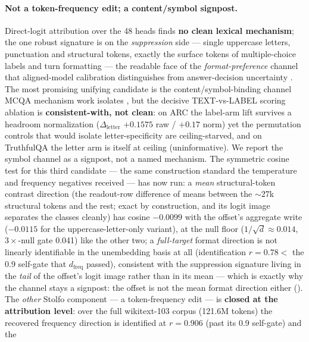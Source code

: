 \paragraph{Not a token-frequency edit; a content/symbol signpost.}
Direct-logit attribution over the 48 heads finds \textbf{no clean lexical
mechanism}; the one robust signature is on the \emph{suppression} side --- single
uppercase letters, punctuation and structural tokens, exactly the surface tokens of
multiple-choice labels and turn formatting --- the readable face of the
\emph{format-preference} channel that aligned-model calibration distinguishes from
answer-decision uncertainty \citep{AlignedMCCalibration}. The most promising
unifying candidate is the content/symbol-binding channel MCQA mechanism work
isolates \citep{TwoStageMCQA,CorrectLetterHeads}, but the decisive TEXT-vs-LABEL
scoring ablation is \textbf{consistent-with, not clean}: on ARC the label-arm lift
survives a headroom normalization ($\Delta_{\mathrm{letter}}$ $+0.1575$ raw /
$+0.17$ norm) yet the permutation controls that would isolate letter-specificity
are ceiling-starved, and on TruthfulQA the letter arm is itself at ceiling
(uninformative). We report the symbol channel as a signpost, not a named mechanism.
The symmetric cosine test for this third candidate --- the same construction
standard the temperature and frequency negatives received --- has now run: a
\emph{mean} structural-token contrast direction (the readout-row difference of
means between the ${\sim}27$k structural tokens and the rest; exact by
construction, and its logit image separates the classes cleanly) has cosine
$\mathbf{-0.0099}$ with the offset's aggregate write ($\mathbf{-0.0115}$ for the
uppercase-letter-only variant), at the null floor ($1/\sqrt{d} \approx 0.014$,
$3\times$-null gate 0.041) like the other two; a \emph{full-target} format
direction is not linearly identifiable in the unembedding basis at all
(identification $r = 0.78 <$ the 0.9 self-gate that $d_{\mathrm{freq}}$ passed),
consistent with the suppression signature living in the \emph{tail} of the offset's
logit image rather than in its mean --- which is exactly why the channel stays a
signpost: the offset is not the mean format direction either
(). The \emph{other} Stolfo
component --- a token-frequency edit --- is \textbf{closed at the attribution
level}: over the full wikitext-103 corpus (121.6M tokens) the recovered frequency
direction is identified at $r{=}\mathbf{0.906}$ (past its 0.9 self-gate) and the
